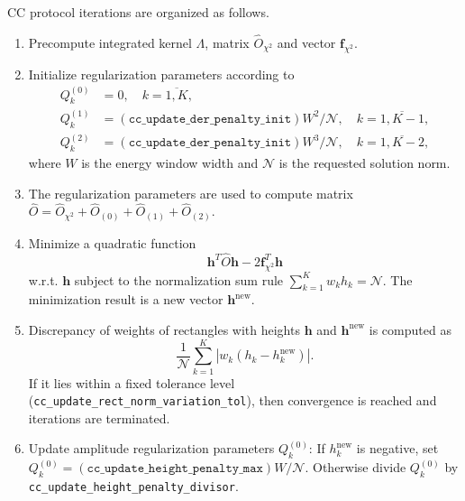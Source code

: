 \documentclass[]{article}
\begin{document}
CC protocol iterations are organized as follows.
\begin{enumerate}
    \item Precompute integrated kernel $\Lambda$, matrix $\hat O_{\chi^2}$ and vector $\mathbf{f}_{\chi^2}$.

    \item Initialize regularization parameters according to
    \begin{align*}
        Q^{(0)}_k &= 0, \quad k=\overline{1,K},\\
        Q^{(1)}_k &= (\mathtt{cc\_update\_der\_penalty\_init})W^2 / \mathcal{N}, \quad k = \overline{1,K-1},\\
        Q^{(2)}_k &= (\mathtt{cc\_update\_der\_penalty\_init})W^3 / \mathcal{N}, \quad k = \overline{1,K-2},
    \end{align*}
    where $W$ is the energy window width and $\mathcal{N}$ is the requested solution norm.

    \item The regularization parameters are used to compute matrix $\hat O =
    \hat O_{\chi^2} + \hat O_{(0)} + \hat O_{(1)} + \hat O_{(2)}$.

    \item Minimize a quadratic function
    \begin{equation}
        \mathbf{h}^T \hat O \mathbf{h} -2\mathbf{f}^T_{\chi^2} \mathbf{h}
    \end{equation}
    w.r.t. $\mathbf{h}$ subject to the normalization sum rule $\sum_{k=1}^K w_k h_k = \mathcal{N}$. The minimization result is a new  vector $\mathbf{h}^\mathrm{new}$.

    \item Discrepancy of weights of rectangles with heights $\mathbf{h}$ and $\mathbf{h}^\mathrm{new}$ is computed as
    \begin{equation}
        \frac{1}{\mathcal{N}}\sum_{k=1}^K |w_k (h_k - h^\mathrm{new}_k)|.
    \end{equation}
    If it lies within a fixed tolerance level (\verb|cc_update_rect_norm_variation_tol|),
    then convergence is reached and iterations are terminated.

    \item Update amplitude regularization parameters $Q^{(0)}_k$: If $h^\mathrm{new}_k$ is negative, set\\
    $Q^{(0)}_k = (\mathtt{cc\_update\_height\_penalty\_max})W / \mathcal{N}$.
    Otherwise divide $Q^{(0)}_k$ by \verb|cc_update_height_penalty_divisor|.


\end{enumerate}
\end{document}
